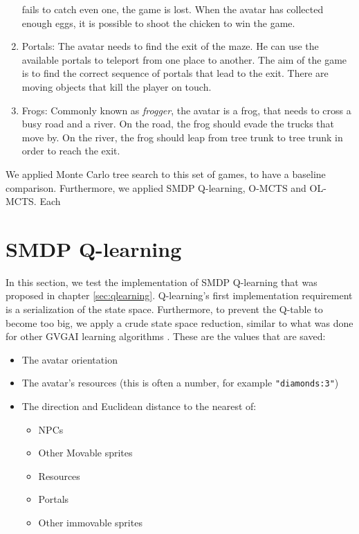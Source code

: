 \begin{enumerate}
		fails to catch even one, the game is lost. When the avatar
		has collected enough eggs, it is possible to shoot the chicken to win
		the game.
	\item Portals:
		The avatar needs to find the exit of the maze. He can use the available
		portals to teleport from one place to another. The aim of the game is to
		find the correct sequence of portals that lead to the exit. There are
		moving objects that kill the player on touch.
	\item Frogs:
		Commonly known as \textit{frogger}, the avatar is a frog, that needs to
		cross a busy road and a river. On the road, the frog should evade the
		trucks that move by. On the river, the frog should leap from tree trunk
		to tree trunk in order to reach the exit.
\end{enumerate}

We applied Monte Carlo tree search to this set of games, to have a baseline
comparison. Furthermore, we applied SMDP Q-learning, O-MCTS and OL-MCTS. Each 

\section{SMDP Q-learning}
In this section, we test the implementation of SMDP Q-learning that was proposed
in chapter \ref{sec:qlearning}. Q-learning's first implementation requirement is
a serialization of the state space.  Furthermore, to prevent the Q-table to
become too big, we apply a crude state space reduction, similar to what was done
for other GVGAI learning algorithms \cite{samothrakis2015neuroevolution}.  These
are the values that are saved:

\begin{itemize}
	\item The avatar orientation
	\item The avatar's resources (this is often a number, for example
		\texttt{"diamonds:3"})
	\item The direction and Euclidean distance to the nearest of:
		\begin{itemize}
			\item NPCs
			\item Other Movable sprites
			\item Resources
			\item Portals
			\item Other immovable sprites
		\end{itemize}
\end{itemize}

